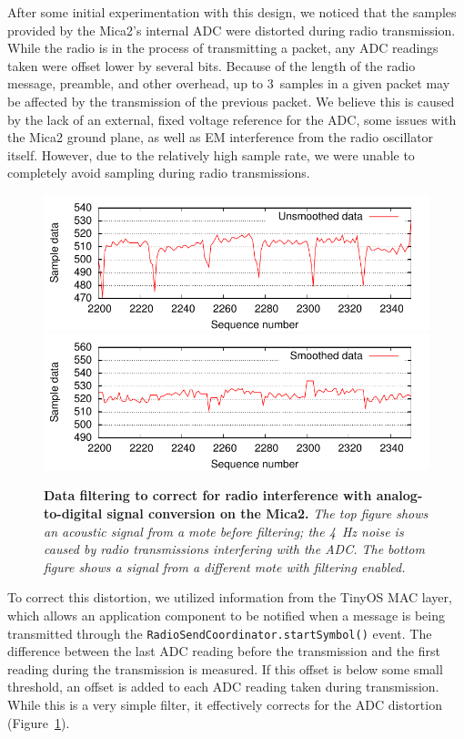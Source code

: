 After some initial experimentation with this design, we noticed that 
the samples provided by the Mica2's internal ADC were distorted
during radio transmission. While the radio is in the process of
transmitting a packet, any ADC readings taken were
offset lower by several bits. Because of the length of the radio
message, preamble, and other overhead, up to 3~samples in a given
packet may be affected by the transmission of the previous packet.
We believe this is caused by the lack of an external, fixed voltage 
reference for the ADC, some issues with the Mica2 ground plane, 
as well as EM interference from the radio oscillator itself. 
However, due to the relatively high sample rate, we were unable to 
completely avoid sampling during radio transmissions. 

\begin{figure}[t]
\begin{center}
\includegraphics[width=0.9\hsize]{./figures/smooth/data-noise.pdf}  \\
\includegraphics[width=0.9\hsize]{./figures/smooth/data-smooth.pdf}
\end{center}
\caption{\small {\bf Data filtering to correct for radio
interference with analog-to-digital signal conversion on the Mica2.} 
{\em The top figure shows an acoustic signal from
a mote before filtering; the 4~Hz noise is caused by radio
transmissions interfering with the ADC. The bottom figure shows a signal 
from a different mote with filtering enabled.}}
\label{fig-distortion}
\end{figure}

To correct this distortion, we utilized information from the TinyOS
MAC layer, which allows an application component to be notified 
when a message is being transmitted through the 
{\tt RadioSendCoordinator.startSymbol()} event. The difference
between the last ADC reading before the transmission and the first
reading during the transmission is measured. If this offset is 
below some small threshold, an offset is added to each ADC reading taken 
during transmission. While this is a very simple filter, 
it effectively corrects for the ADC distortion (Figure~\ref{fig-distortion}).

